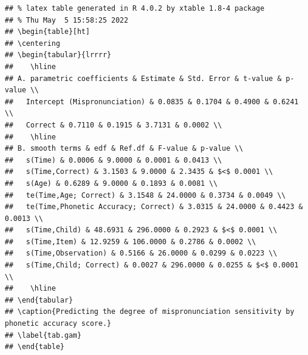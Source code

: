 \documentclass[
]{article}
\begin{document}
\begin{verbatim}
## % latex table generated in R 4.0.2 by xtable 1.8-4 package
## % Thu May  5 15:58:25 2022
## \begin{table}[ht]
## \centering
## \begin{tabular}{lrrrr}
##    \hline
## A. parametric coefficients & Estimate & Std. Error & t-value & p-value \\ 
##   Intercept (Mispronunciation) & 0.0835 & 0.1704 & 0.4900 & 0.6241 \\ 
##   Correct & 0.7110 & 0.1915 & 3.7131 & 0.0002 \\ 
##    \hline
## B. smooth terms & edf & Ref.df & F-value & p-value \\ 
##   s(Time) & 0.0006 & 9.0000 & 0.0001 & 0.0413 \\ 
##   s(Time,Correct) & 3.1503 & 9.0000 & 2.3435 & $<$ 0.0001 \\ 
##   s(Age) & 0.6289 & 9.0000 & 0.1893 & 0.0081 \\ 
##   te(Time,Age; Correct) & 3.1548 & 24.0000 & 0.3734 & 0.0049 \\ 
##   te(Time,Phonetic Accuracy; Correct) & 3.0315 & 24.0000 & 0.4423 & 0.0013 \\ 
##   s(Time,Child) & 48.6931 & 296.0000 & 0.2923 & $<$ 0.0001 \\ 
##   s(Time,Item) & 12.9259 & 106.0000 & 0.2786 & 0.0002 \\ 
##   s(Time,Observation) & 0.5166 & 26.0000 & 0.0299 & 0.0223 \\ 
##   s(Time,Child; Correct) & 0.0027 & 296.0000 & 0.0255 & $<$ 0.0001 \\ 
##    \hline
## \end{tabular}
## \caption{Predicting the degree of mispronunciation sensitivity by phonetic accuracy score.} 
## \label{tab.gam}
## \end{table}
\end{verbatim}
\end{document}
